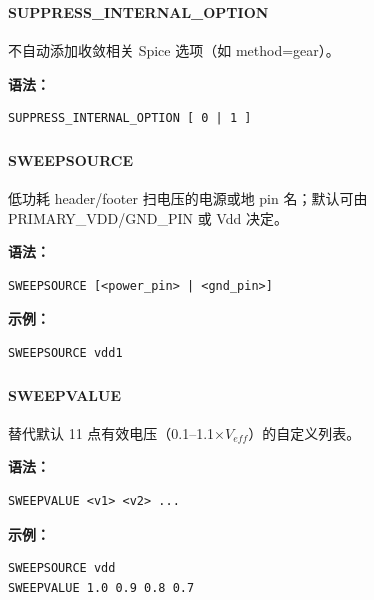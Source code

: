 \subsubsection{}
\paragraph*{SUPPRESS_INTERNAL_OPTION}

不自动添加收敛相关 Spice 选项（如 method=gear）。

\textbf{语法：}
\begin{lstlisting}
SUPPRESS_INTERNAL_OPTION [ 0 | 1 ]
\end{lstlisting}

\subsubsection{}
\paragraph*{SWEEPSOURCE}

低功耗 header/footer 扫电压的电源或地 pin 名；默认可由 PRIMARY\_VDD/GND\_PIN 或 Vdd 决定。

\textbf{语法：}
\begin{lstlisting}
SWEEPSOURCE [<power_pin> | <gnd_pin>]
\end{lstlisting}

\textbf{示例：}
\begin{lstlisting}
SWEEPSOURCE vdd1
\end{lstlisting}

\subsubsection{}
\paragraph*{SWEEPVALUE}

替代默认 11 点有效电压（0.1--1.1$\times V_{eff}$）的自定义列表。

\textbf{语法：}
\begin{lstlisting}
SWEEPVALUE <v1> <v2> ...
\end{lstlisting}

\textbf{示例：}
\begin{lstlisting}
SWEEPSOURCE vdd
SWEEPVALUE 1.0 0.9 0.8 0.7
\end{lstlisting}


